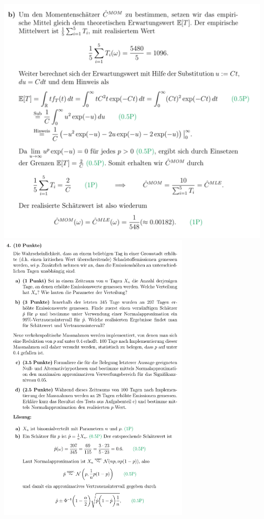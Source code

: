 \includegraphics[width=0.8\linewidth]{old_exams_prtsrc/sch_infk_so19_ml-08.png}\newline
\includegraphics[height=143mm]{old_exams_prtsrc/sch_infk_so19_ml-09.png}\newline
